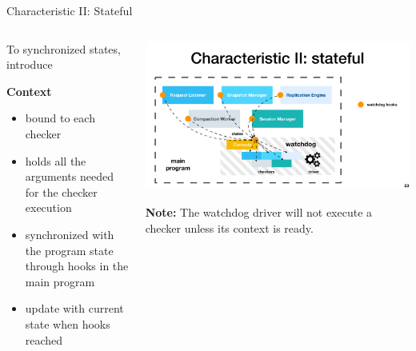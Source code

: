 \documentclass[aspectratio=169]{beamer}
\begin{document}
\begin{frame}{Characteristic II: Stateful}
\begin{columns}
    
    \begin{column}{.5\textwidth}
        To synchronized states, introduce
        \begin{block}{\textbf{Context}}
            \begin{itemize}
                \item bound
                to each checker
                \item  holds all the arguments needed for the
                checker execution
                \item  synchronized with the program state through hooks in the main program
                \item update with current state when hooks reached 
            \end{itemize}
        \end{block}
    \end{column}

    \begin{column}{.5\textwidth}

        \begin{center}
            \includegraphics[width=\textwidth]{fig/staetful}
        \end{center}

        \textbf{Note:} The watchdog driver will not execute a checker unless its context is ready.

    \end{column}
\end{columns}

\end{frame}
\end{document}
